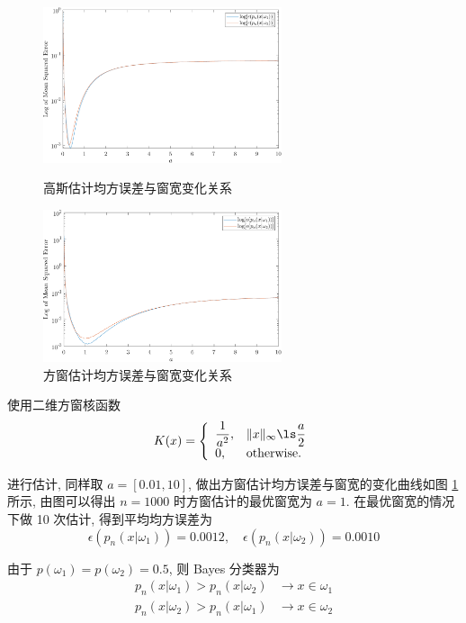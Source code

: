 \documentclass[openany]{ctexbook}
\theoremstyle{kaiti}
\theoremstyle{normal}
\begin{document}
\begin{figure}[tbp]
  \centering
  \begin{minipage}[t]{0.48\textwidth}
  \centering
  \includegraphics[width=7cm]{mseGaussian.pdf}
  \caption{高斯估计均方误差与窗宽变化关系}
  \label{fig:mseGaussian}
  \end{minipage}
  \begin{minipage}[t]{0.48\textwidth}
  \centering
  \includegraphics[width=7cm]{mseCube.pdf}
  \caption{方窗估计均方误差与窗宽变化关系}
  \label{fig:mseCube}
  \end{minipage}
\end{figure}

使用二维方窗核函数
\begin{equation}
  K(x)=
  \left\{
    \begin{array}{ll}
      \dfrac{1}{a^2},& \|x\|_\infty \ls\dfrac{a}{2} \\
      0, & \text{otherwise.}
    \end{array}
  \right.
\end{equation}

进行估计, 同样取 $a=[0.01,10]$, 做出方窗估计均方误差与窗宽的变化曲线如图 \ref{fig:mseCube} 所示, 由图可以得出 $n=1000$ 时方窗估计的最优窗宽为 $a=1$. 在最优窗宽的情况下做 10 次估计, 得到平均均方误差为
\begin{equation}
  \epsilon(p_n(x|\omega_1))=0.0012,\quad\epsilon(p_n(x|\omega_2))=0.0010
\end{equation}

由于 $p(\omega_{1})=p(\omega_{2})= 0.5$, 则 Bayes 分类器为
\begin{equation}
  \begin{aligned}
    p_n(x|\omega_1) > p_n(x|\omega_2) &\to x\in\omega_1\\
    p_n(x|\omega_2) > p_n(x|\omega_1) &\to x\in\omega_2\\
  \end{aligned}
\end{equation}
\end{document}
